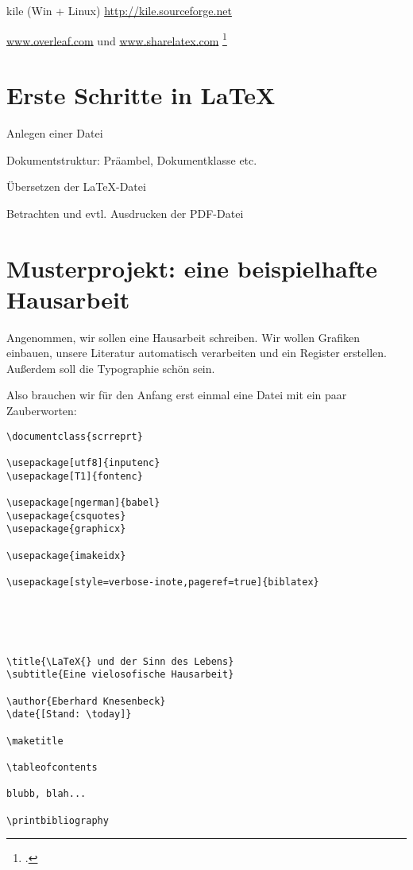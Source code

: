 \begin{labeling}{}
\item[kile] (Win + Linux) \url{http://kile.sourceforge.net}

\end{labeling}

\url{www.overleaf.com}  und \url{www.sharelatex.com} 
\footcite{meyer:dtk2015/1}



\section{Erste Schritte in \LaTeX}

Anlegen einer Datei

Dokumentstruktur: Präambel, Dokumentklasse etc.

Übersetzen der \LaTeX{}-Datei

Betrachten und evtl. Ausdrucken der PDF-Datei


\section{Musterprojekt: eine beispielhafte Hausarbeit}

Angenommen, wir sollen eine Hausarbeit schreiben.
Wir wollen Grafiken einbauen, unsere Literatur automatisch verarbeiten und ein Register erstellen.
Außerdem soll die Typographie schön sein.

Also brauchen wir für den Anfang erst einmal eine Datei mit ein paar Zauberworten:



\begin{lstlisting}
\documentclass{scrreprt}
 
\usepackage[utf8]{inputenc}
\usepackage[T1]{fontenc}

\usepackage[ngerman]{babel}
\usepackage{csquotes}
\usepackage{graphicx}

\usepackage{imakeidx}

\usepackage[style=verbose-inote,pageref=true]{biblatex}





\title{\LaTeX{} und der Sinn des Lebens}
\subtitle{Eine vielosofische Hausarbeit}

\author{Eberhard Knesenbeck}
\date{[Stand: \today]}

\maketitle

\tableofcontents

blubb, blah...

\printbibliography

\end{lstlisting}

